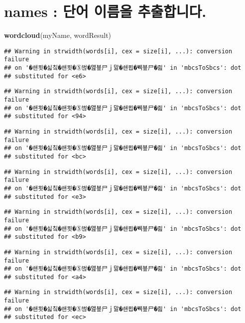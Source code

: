 \documentclass[]{article}
\newenvironment{Shaded}{\begin{snugshade}}{\end{snugshade}}
\newcommand{\KeywordTok}[1]{\textcolor[rgb]{0.13,0.29,0.53}{\textbf{#1}}}
\newcommand{\NormalTok}[1]{#1}
\begin{document}
\section{names : 단어 이름을 추출합니다.}\label{names---.}

\begin{Shaded}
\begin{Highlighting}[]
\KeywordTok{wordcloud}\NormalTok{(myName, wordResult)}
\end{Highlighting}
\end{Shaded}

\begin{verbatim}
## Warning in strwidth(words[i], cex = size[i], ...): conversion failure
## on '�쇈묏�싧칰�쇈묏�⑤벊�앮뵾尸ｊ맒�쇈묍�붹뵾尸�즲' in 'mbcsToSbcs': dot
## substituted for <e6>
\end{verbatim}

\begin{verbatim}
## Warning in strwidth(words[i], cex = size[i], ...): conversion failure
## on '�쇈묏�싧칰�쇈묏�⑤벊�앮뵾尸ｊ맒�쇈묍�붹뵾尸�즲' in 'mbcsToSbcs': dot
## substituted for <94>
\end{verbatim}

\begin{verbatim}
## Warning in strwidth(words[i], cex = size[i], ...): conversion failure
## on '�쇈묏�싧칰�쇈묏�⑤벊�앮뵾尸ｊ맒�쇈묍�붹뵾尸�즲' in 'mbcsToSbcs': dot
## substituted for <bc>
\end{verbatim}

\begin{verbatim}
## Warning in strwidth(words[i], cex = size[i], ...): conversion failure
## on '�쇈묏�싧칰�쇈묏�⑤벊�앮뵾尸ｊ맒�쇈묍�붹뵾尸�즲' in 'mbcsToSbcs': dot
## substituted for <e3>
\end{verbatim}

\begin{verbatim}
## Warning in strwidth(words[i], cex = size[i], ...): conversion failure
## on '�쇈묏�싧칰�쇈묏�⑤벊�앮뵾尸ｊ맒�쇈묍�붹뵾尸�즲' in 'mbcsToSbcs': dot
## substituted for <b9>
\end{verbatim}

\begin{verbatim}
## Warning in strwidth(words[i], cex = size[i], ...): conversion failure
## on '�쇈묏�싧칰�쇈묏�⑤벊�앮뵾尸ｊ맒�쇈묍�붹뵾尸�즲' in 'mbcsToSbcs': dot
## substituted for <a4>
\end{verbatim}

\begin{verbatim}
## Warning in strwidth(words[i], cex = size[i], ...): conversion failure
## on '�쇈묏�싧칰�쇈묏�⑤벊�앮뵾尸ｊ맒�쇈묍�붹뵾尸�즲' in 'mbcsToSbcs': dot
## substituted for <ec>
\end{verbatim}
\end{document}
